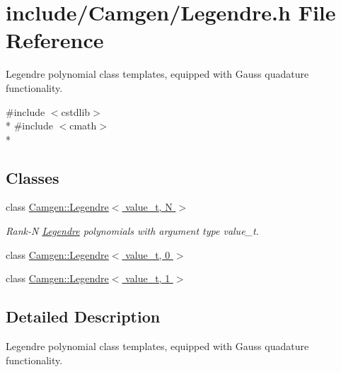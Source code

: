 \hypertarget{a00657}{\section{include/\-Camgen/\-Legendre.h File Reference}
\label{a00657}
}


Legendre polynomial class templates, equipped with Gauss quadature functionality.  


{\ttfamily \#include $<$cstdlib$>$}\\*
{\ttfamily \#include $<$cmath$>$}\\*
\subsection*{Classes}
\begin{DoxyCompactItemize}
\item 
class \hyperlink{a00319}{Camgen\-::\-Legendre$<$ value\-\_\-t, N $>$}
\begin{DoxyCompactList}\small\item\em Rank-\/\-N \hyperlink{a00319}{Legendre} polynomials with argument type value\-\_\-t. \end{DoxyCompactList}\item 
class \hyperlink{a00320}{Camgen\-::\-Legendre$<$ value\-\_\-t, 0 $>$}
\item 
class \hyperlink{a00321}{Camgen\-::\-Legendre$<$ value\-\_\-t, 1 $>$}
\end{DoxyCompactItemize}


\subsection{Detailed Description}
Legendre polynomial class templates, equipped with Gauss quadature functionality. 